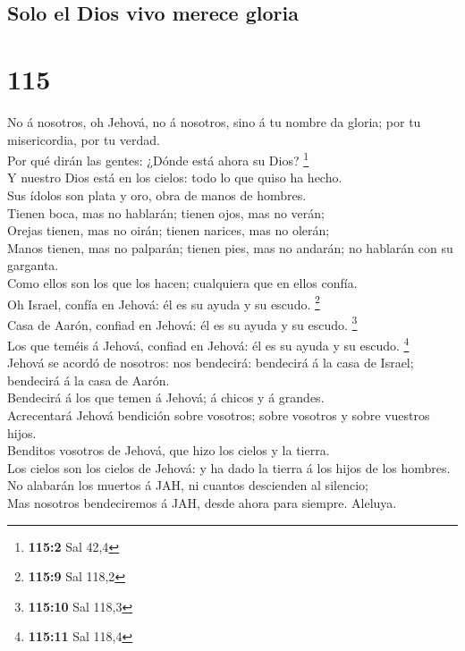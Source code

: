 \hypertarget{solo-el-dios-vivo-merece-gloria}{%
\subsection{Solo el Dios vivo merece
gloria}\label{solo-el-dios-vivo-merece-gloria}}

\hypertarget{section-114}{%
\section{115}\label{section-114}}

 No á nosotros, oh Jehová, no á nosotros, sino á tu nombre
da gloria; por tu misericordia, por tu verdad.\\
 Por qué dirán las gentes: ¿Dónde está ahora su Dios?
\footnote{\textbf{115:2} Sal 42,4}\\
 Y nuestro Dios está en los cielos: todo lo que quiso ha
hecho.\\
 Sus ídolos son plata y oro, obra de manos de hombres.\\
 Tienen boca, mas no hablarán; tienen ojos, mas no
verán;\\
 Orejas tienen, mas no oirán; tienen narices, mas no
olerán;\\
 Manos tienen, mas no palparán; tienen pies, mas no
andarán; no hablarán con su garganta.\\
 Como ellos son los que los hacen; cualquiera que en ellos
confía.\\
 Oh Israel, confía en Jehová: él es su ayuda y su escudo.
\footnote{\textbf{115:9} Sal 118,2}\\
 Casa de Aarón, confiad en Jehová: él es su ayuda y su
escudo. \footnote{\textbf{115:10} Sal 118,3}\\
 Los que teméis á Jehová, confiad en Jehová: él es su
ayuda y su escudo. \footnote{\textbf{115:11} Sal 118,4}\\
 Jehová se acordó de nosotros: nos bendecirá: bendecirá á
la casa de Israel; bendecirá á la casa de Aarón.\\
 Bendecirá á los que temen á Jehová; á chicos y á
grandes.\\
 Acrecentará Jehová bendición sobre vosotros; sobre
vosotros y sobre vuestros hijos.\\
 Benditos vosotros de Jehová, que hizo los cielos y la
tierra.\\
 Los cielos son los cielos de Jehová: y ha dado la tierra
á los hijos de los hombres.\\
 No alabarán los muertos á JAH, ni cuantos descienden al
silencio;\\
 Mas nosotros bendeciremos á JAH, desde ahora para
siempre. Aleluya.

